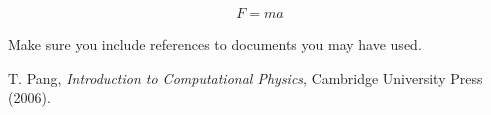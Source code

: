 \documentclass[prb,twocolumn]{revtex4}
\begin{document}
\begin{eqnarray}
F=ma
\label{namefornewequation}
\end{eqnarray}



Make sure you include references to documents \cite{thecoursetext} you may have used.

\begin{thebibliography}{99}

 T. Pang, \emph{Introduction to Computational Physics}, Cambridge University Press (2006).

\end{thebibliography}
\end{document}
